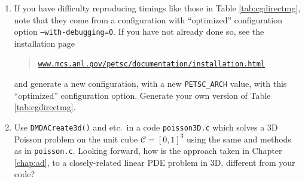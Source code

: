\begin{enumerate}
\item If you have difficulty reproducing timings like those in Table \ref{tab:cgdirectmg}, note that they come from a \PETSc configuration with ``optimized'' configuration option \texttt{--with-debugging=0}.  If you have not already done so, see the \PETSc installation page
\begin{quote}
\href{http://www.mcs.anl.gov/petsc/documentation/installation.html}{\texttt{www.mcs.anl.gov/petsc/documentation/installation.html}}
\end{quote}
and generate a new configuration, with a new \texttt{PETSC\_ARCH} value, with this ``optimized'' configuration option.  Generate your own version of Table \ref{tab:cgdirectmg}.

\item Use \texttt{DMDACreate3d()} and etc.~in a code \texttt{poisson3D.c} which solves a 3D Poisson problem on the unit cube $\mathcal{C}=[0,1]^3$ using the same \pDMDA and \pKSP methods as in \texttt{poisson.c}.  Looking forward, how is the approach taken in Chapter \ref{chap:ad}, to a closely-related linear PDE problem in 3D, different from your code?

\end{enumerate}
